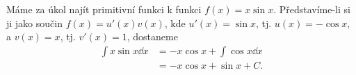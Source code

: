 \begin{mdframed}[style=mdexam]
  \begin{example}\label{MAI:exam111}
    Máme za úkol najít primitivní funkci k funkci \(f(x) = x\sin x\). Představíme-li si ji jako 
    součin \(f(x) = u'(x)v(x)\), kde \(u'(x) = \sin x\), tj. \(u(x) = -\cos x\), a \(v(x)= x\), 
    tj. \(v'(x) = 1\), dostaneme
    \begin{align*}
      \int x\sin x\dd{x} &= -x\cos x + \int\cos x\dd{x} \\
                      &= -x\cos x + \sin x + C.
    \end{align*}    
  \end{example}
\end{mdframed}